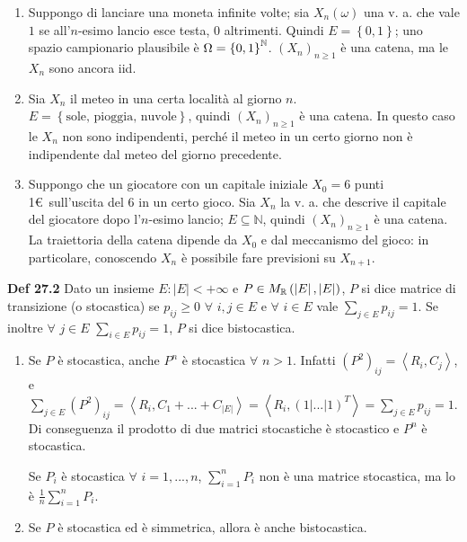 \documentclass{article}
\begin{document}
\begin{enumerate}
\item Suppongo di lanciare una moneta infinite volte; sia $X_{n}\left(
\omega \right) $ una v. a. che vale $1$ se all'$n$-esimo lancio esce testa, $%
0$ altrimenti. Quindi $E=\left\{ 0,1\right\} $; uno spazio campionario
plausibile \`{e} $\Omega =\left\{ 0,1\right\} ^{%
\mathbb{N}
}$. $\left( X_{n}\right) _{n\geq 1}$ \`{e} una catena, ma le $X_{n}$ sono
ancora iid.

\item Sia $X_{n}$ il meteo in una certa localit\`{a} al giorno $n$. $%
E=\left\{ \text{sole, pioggia, nuvole}\right\} $, quindi $\left(
X_{n}\right) _{n\geq 1}$ \`{e} una catena. In questo caso le $X_{n}$ non
sono indipendenti, perch\'{e} il meteo in un certo giorno non \`{e}
indipendente dal meteo del giorno precedente.

\item Suppongo che un giocatore con un capitale iniziale $X_{0}=6$ punti
1\euro\ sull'uscita del 6 in un certo gioco. Sia $X_{n}$ la v. a. che
descrive il capitale del giocatore dopo l'$n$-esimo lancio; $E\subseteq 
\mathbb{N}
$, quindi $\left( X_{n}\right) _{n\geq 1}$ \`{e} una catena. La traiettoria
della catena dipende da $X_{0}$ e dal meccanismo del gioco: in particolare,
conoscendo $X_{n}$ \`{e} possibile fare previsioni su $X_{n+1}$.
\end{enumerate}

\textbf{Def 27.2} Dato un insieme $E:\left\vert E\right\vert <+\infty $ e $%
P\in M_{%
\mathbb{R}
}\left( \left\vert E\right\vert ,\left\vert E\right\vert \right) $, $P$ si
dice matrice di transizione (o stocastica) se $p_{ij}\geq 0$ $\forall $ $%
i,j\in E$ e $\forall $ $i\in E$ vale $\sum_{j\in E}p_{ij}=1$. Se inoltre $%
\forall $ $j\in E$ $\sum_{i\in E}p_{ij}=1$, $P$ si dice bistocastica.

\begin{enumerate}
\item Se $P$ \`{e} stocastica, anche $P^{n}$ \`{e} stocastica $\forall $ $%
n>1 $. Infatti $\left( P^{2}\right) _{ij}=\left\langle
R_{i},C_{j}\right\rangle $, e $\sum_{j\in E}\left( P^{2}\right)
_{ij}=\left\langle R_{i},C_{1}+...+C_{\left\vert E\right\vert }\right\rangle
=\left\langle R_{i},\left( 1|...|1\right) ^{T}\right\rangle =\sum_{j\in
E}p_{ij}=1$. Di conseguenza il prodotto di due matrici stocastiche \`{e}
stocastico e $P^{n}$ \`{e} stocastica.

Se $P_{i}$ \`{e} stocastica $\forall $ $i=1,...,n$, $\sum_{i=1}^{n}P_{i}$
non \`{e} una matrice stocastica, ma lo \`{e} $\frac{1}{n}%
\sum_{i=1}^{n}P_{i} $.

\item Se $P$ \`{e} stocastica ed \`{e} simmetrica, allora \`{e} anche
bistocastica.
\end{enumerate}
\end{document}
